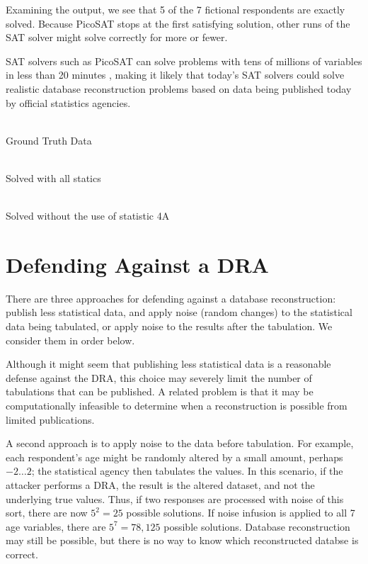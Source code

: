 \documentclass[runningheads]{llncs}
\begin{document}
Examining the output, we see that 5 of the 7 fictional respondents are
exactly solved. Because PicoSAT stops at the first satisfying
solution, other runs of the SAT solver might solve correctly for
more or fewer. 

SAT solvers such as PicoSAT can solve problems
with tens of millions of variables in less than 20 minutes
\cite{satcomp}, making it likely that today's SAT solvers could solve
realistic database reconstruction problems based on data being
published today by official statistics agencies.


\begin{table*}
\begin{minipage}[t]{.33\linewidth}
~\\

\caption{Ground Truth Data}
\end{minipage}
\hfill
\begin{minipage}[t]{.33\linewidth}
~\\

\caption{Solved with all statics}
\end{minipage}
\hfill
\begin{minipage}[t]{.33\linewidth}
~\\

\caption{Solved without the use of statistic 4A}
\end{minipage}
\hfill
\end{table*}

\section{Defending Against a DRA}\label{solution}
There are three approaches for defending against a database reconstruction: publish less
statistical data, and apply noise (random changes) to the
statistical data being tabulated, or apply noise to the results after
the tabulation. We consider them in order below.

Although it might seem that publishing less statistical data is a
reasonable defense against the DRA, this choice may severely limit the number
of tabulations that can be published. A
related problem is that it may be computationally infeasible to
determine when a reconstruction is possible from limited publications.

A second approach is to apply noise to the data before
tabulation. For example, each respondent's age might be randomly
altered by a small amount, perhaps $-2 \ldots 2$; 
the statistical agency then tabulates the values. 
In this scenario, if the attacker performs a DRA, the result is the altered dataset, and not the underlying true values. Thus, if two responses
are processed with noise of this sort, there are now $5^2 = 25$
possible solutions. If noise infusion is applied to all 7 age
variables, there are $5^{7}=78,125$ possible
solutions. Database reconstruction may still be possible, but there is no
way to know which reconstructed databse is correct. 
\end{document}
